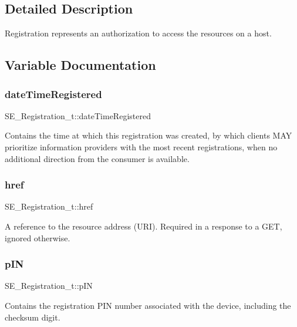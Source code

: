 \subsection{Detailed Description}
Registration represents an authorization to access the resources on a host. 

\subsection{Variable Documentation}
\mbox{\label{group__Registration_gabd2cd11ffd9eed1da4ff688b6be28b19}} 
\subsubsection{\texorpdfstring{date\+Time\+Registered}{dateTimeRegistered}}
{\footnotesize\ttfamily S\+E\+\_\+\+Registration\+\_\+t\+::date\+Time\+Registered}

Contains the time at which this registration was created, by which clients M\+AY prioritize information providers with the most recent registrations, when no additional direction from the consumer is available. \mbox{\label{group__Registration_ga76fcf14a2f87084c2513efdfe08f25b5}} 
\subsubsection{\texorpdfstring{href}{href}}
{\footnotesize\ttfamily S\+E\+\_\+\+Registration\+\_\+t\+::href}

A reference to the resource address (U\+RI). Required in a response to a G\+ET, ignored otherwise. \mbox{\label{group__Registration_ga81325290ed2a058059fb75d933c159ae}} 
\subsubsection{\texorpdfstring{p\+IN}{pIN}}
{\footnotesize\ttfamily S\+E\+\_\+\+Registration\+\_\+t\+::p\+IN}

Contains the registration P\+IN number associated with the device, including the checksum digit. \mbox{\label{group__Registration_ga7168a63281b2883dea8ab4f1366e854b}} 
